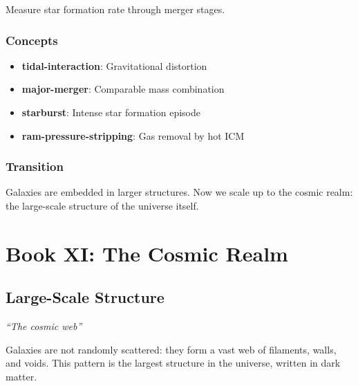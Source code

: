 \documentclass[
  11pt,
  letterpaper,
  twoside,
  openright]{book}
\providecommand{\tightlist}{%
  \setlength{\itemsep}{0pt}\setlength{\parskip}{0pt}}
\begin{document}
Measure star formation rate through merger stages.

\section{Concepts}\label{concepts-27}

\begin{itemize}
\tightlist
\item
  \textbf{tidal-interaction}: Gravitational distortion
\item
  \textbf{major-merger}: Comparable mass combination
\item
  \textbf{starburst}: Intense star formation episode
\item
  \textbf{ram-pressure-stripping}: Gas removal by hot ICM
\end{itemize}

\section{Transition}\label{transition-27}

Galaxies are embedded in larger structures. Now we scale up to the
cosmic realm: the large-scale structure of the universe itself.

\part{Book XI: The Cosmic Realm}

\chapter{Large-Scale Structure}\label{sec-large-scale-structure}

\emph{``The cosmic web''}

\begin{tcolorbox}[enhanced jigsaw, coltitle=black, colbacktitle=quarto-callout-note-color!10!white, toprule=.15mm, colframe=quarto-callout-note-color-frame, arc=.35mm, opacityback=0, bottomtitle=1mm, toptitle=1mm, breakable, colback=white, titlerule=0mm, opacitybacktitle=0.6, title=\textcolor{quarto-callout-note-color}{\faInfo}\hspace{0.5em}{Key Revelation}, rightrule=.15mm, bottomrule=.15mm, leftrule=.75mm, left=2mm]

Galaxies are not randomly scattered: they form a vast web of filaments,
walls, and voids. This pattern is the largest structure in the universe,
written in dark matter.

\end{tcolorbox}
\end{document}
